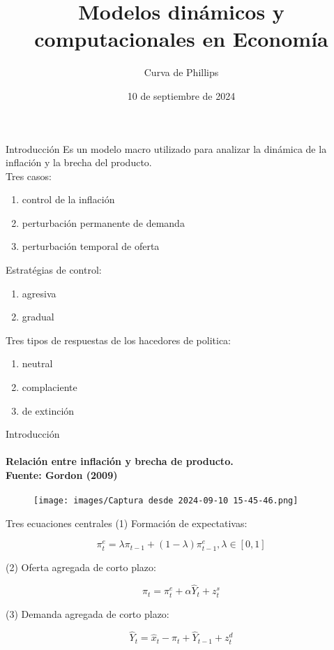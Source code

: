 \documentclass[11pt]{beamer}
\begin{document}
	\title{Modelos dinámicos y computacionales en Economía}
	\subtitle{Curva de Phillips}
	\date{10 de septiembre de 2024}
	\frame[plain]{\maketitle}
	
	
	
	\begin{frame}{Introducción}
		Es un modelo macro utilizado para analizar la dinámica de la inflación y la brecha del producto.\\
		Tres casos:\\
\begin{enumerate}
	\item control de la inflación
	\item perturbación permanente de demanda
	\item perturbación temporal de oferta
\end{enumerate}
		Estratégias de control:\\
\begin{enumerate}
	\item agresiva
	\item gradual
\end{enumerate}		
		
		Tres tipos de respuestas de los hacedores de politica:
\begin{enumerate}
	\item neutral
	\item complaciente
	\item de extinción
\end{enumerate}		
	\end{frame}


 \begin{frame}{Introducción}
 \framesubtitle{Relación entre inflación y brecha de producto. \\Fuente: Gordon (2009)}
     \begin{figure}
         \centering
         \texttt{[image: images/Captura desde 2024-09-10 15-45-46.png]}
         \label{fig:enter-label}
     \end{figure}
 \end{frame}
	\begin{frame}{Tres ecuaciones centrales}
		(1) Formación de expectativas:
		
		$$
		\pi_{t}^{e}=\lambda \pi_{t-1}+(1-\lambda) \pi_{t-1}^{e}, \lambda \in[0,1]
		$$
		
		(2) Oferta agregada de corto plazo:
		
		$$
		\pi_{t}=\pi_{t}^{e}+\alpha \widehat{Y}_{t}+z_{t}^{s}
		$$
		
		(3) Demanda agregada de corto plazo:
		
		$$
		\widehat{Y}_{t}=\widehat{x}_{t}-\pi_{t}+\widehat{Y}_{t-1}+z_{t}^{d}
		$$
		
	\end{frame}
	
\end{document}
